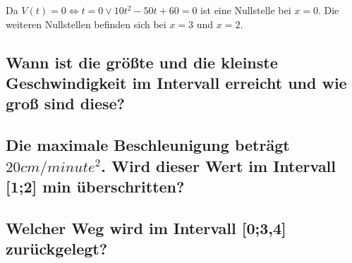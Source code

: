 \documentclass[a4paper,11pt]{scrartcl}
\begin{document}
Da $V(t) = 0 \Leftrightarrow t = 0 \vee 10t^2 - 50t + 60 = 0$ ist eine
Nullstelle bei $x = 0$. Die weiteren Nullstellen befinden sich bei $x = 3$ und
$x = 2$.

\subsection{Wann ist die größte und die kleinste Geschwindigkeit im Intervall
erreicht und wie groß sind diese?}

\subsection{Die maximale Beschleunigung beträgt $20cm / minute^2$. Wird dieser
Wert im Intervall [1;2] min überschritten?}

\subsection{Welcher Weg wird im Intervall [0;3,4] zurückgelegt?}
\end{document}
